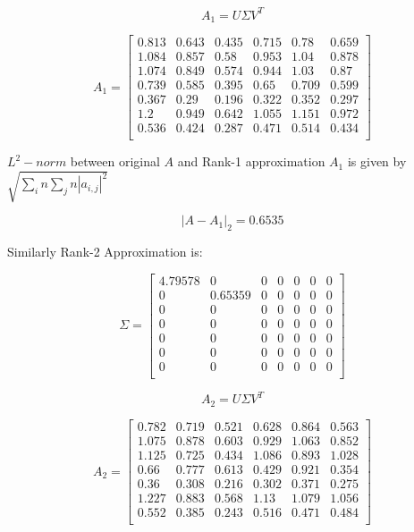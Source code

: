 \documentclass{article}
\begin{document}
$$
A_1 = 
U \Sigma V^T
$$ 

$$
A_1 = 
\begin{bmatrix}
0.813 & 0.643 & 0.435 & 0.715 & 0.78  & 0.659\\
1.084 & 0.857 & 0.58  & 0.953 & 1.04  & 0.878\\
1.074 & 0.849 & 0.574 & 0.944 & 1.03  & 0.87\\
0.739 & 0.585 & 0.395 & 0.65  & 0.709 & 0.599\\
0.367 & 0.29  & 0.196 & 0.322 & 0.352 & 0.297\\
1.2   & 0.949 & 0.642 & 1.055 & 1.151 & 0.972\\
0.536 & 0.424 & 0.287 & 0.471 & 0.514 & 0.434\\
\end{bmatrix}
$$

$L^2-norm$ between original $A$ and Rank-1 approximation $A_1$ is given by $\sqrt{\sum_{i}{n}\sum_{j}{n} |a_{i,j}|^2}$ 

$$
|A - A_1|_2 = 0.6535
$$

Similarly Rank-2 Approximation is:

$$
\Sigma = 
\begin{bmatrix}
4.79578 & 0 & 0 & 0 & 0 & 0 & 0\\
0 & 0.65359 & 0 & 0 & 0 & 0 & 0\\
0 & 0 & 0 & 0 & 0 & 0 & 0\\
0 & 0 & 0 & 0 & 0 & 0 & 0\\
0 & 0 & 0 & 0 & 0 & 0 & 0\\
0 & 0 & 0 & 0 & 0 & 0 & 0\\
0 & 0 & 0 & 0 & 0 & 0 & 0\\
\end{bmatrix}
$$

$$
A_2 = 
U \Sigma V^T
$$ 

$$
A_2 = 
\begin{bmatrix}
0.782 & 0.719 & 0.521 & 0.628 & 0.864 & 0.563\\
1.075 & 0.878 & 0.603 & 0.929 & 1.063 & 0.852\\
1.125 & 0.725 & 0.434 & 1.086 & 0.893 & 1.028\\
0.66  & 0.777 & 0.613 & 0.429 & 0.921 & 0.354\\
0.36  & 0.308 & 0.216 & 0.302 & 0.371 & 0.275\\
1.227 & 0.883 & 0.568 & 1.13  & 1.079 & 1.056\\
0.552 & 0.385 & 0.243 & 0.516 & 0.471 & 0.484\\
\end{bmatrix}
$$
\end{document}
